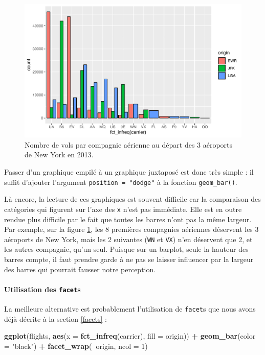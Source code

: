 \documentclass[a4paperpaper,]{article}
\newenvironment{Shaded}{\begin{snugshade}}{\end{snugshade}}
\newcommand{\KeywordTok}[1]{\textcolor[rgb]{0.13,0.29,0.53}{\textbf{#1}}}
\newcommand{\DataTypeTok}[1]{\textcolor[rgb]{0.13,0.29,0.53}{#1}}
\newcommand{\DecValTok}[1]{\textcolor[rgb]{0.00,0.00,0.81}{#1}}
\newcommand{\StringTok}[1]{\textcolor[rgb]{0.31,0.60,0.02}{#1}}
\newcommand{\OperatorTok}[1]{\textcolor[rgb]{0.81,0.36,0.00}{\textbf{#1}}}
\newcommand{\NormalTok}[1]{#1}
\let\oldparagraph\paragraph
\renewcommand{\paragraph}[1]{\oldparagraph{#1}\mbox{}}
\theoremstyle{definition}
\theoremstyle{definition}
\theoremstyle{definition}
\theoremstyle{remark}
\begin{document}
\begin{figure}[htpb]

{\centering \includegraphics[width=0.9\linewidth]{figure/dodge-1} 

}

\caption{Nombre de vols par compagnie aérienne au départ des 3 aéroports de New York en 2013.}\label{fig:dodge}
\end{figure}

Passer d'un graphique empilé à un graphique juxtaposé est donc très
simple : il suffit d'ajouter l'argument \texttt{position\ =\ "dodge"} à
la fonction \texttt{geom\_bar()}.

Là encore, la lecture de ces graphiques est souvent difficile car la
comparaison des catégories qui figurent sur l'axe des \texttt{x} n'est
pas immédiate. Elle est en outre rendue plus difficile par le fait que
toutes les barres n'ont pas la même largeur. Par exemple, sur la figure
\ref{fig:dodge}, les 8 premières compagnies aériennes déservent les 3
aéroports de New York, mais les 2 suivantes (\texttt{WN} et \texttt{VX})
n'en déservent que 2, et les autres compagnie, qu'un seul. Puisque sur
un barplot, seule la hauteur des barres compte, il faut prendre garde à
ne pas se laisser influencer par la largeur des barres qui pourrait
fausser notre perception.

\paragraph{\texorpdfstring{Utilisation des
\texttt{facet}s}{Utilisation des facets}}\label{utilisation-des-facets}

La meilleure alternative est probablement l'utilisation de
\texttt{facet}s que nous avons déjà décrite à la section \ref{facets} :

\begin{Shaded}
\begin{Highlighting}[]
\KeywordTok{ggplot}\NormalTok{(flights, }\KeywordTok{aes}\NormalTok{(}\DataTypeTok{x =} \KeywordTok{fct_infreq}\NormalTok{(carrier), }\DataTypeTok{fill =}\NormalTok{ origin)) }\OperatorTok{+}
\StringTok{  }\KeywordTok{geom_bar}\NormalTok{(}\DataTypeTok{color =} \StringTok{"black"}\NormalTok{) }\OperatorTok{+}
\StringTok{  }\KeywordTok{facet_wrap}\NormalTok{(}\OperatorTok{~}\NormalTok{origin, }\DataTypeTok{ncol =} \DecValTok{1}\NormalTok{)}
\end{Highlighting}
\end{Shaded}
\end{document}
